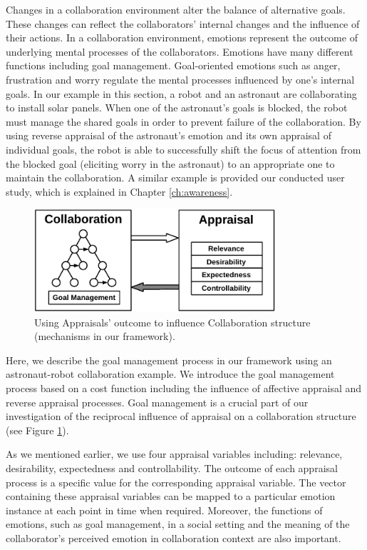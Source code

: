 \documentclass[12pt]{report}
\begin{document}
Changes in a collaboration environment alter the balance of alternative goals.
These changes can reflect the collaborators' internal changes and the influence
of their actions. In a collaboration environment, emotions represent the outcome
of underlying mental processes of the collaborators. Emotions have many
different functions \cite{scheutz:architectural-action-selection} including
goal management. Goal-oriented emotions such as anger, frustration and
worry regulate the mental processes influenced by one's internal goals. In our
example in this section, a robot and an astronaut are collaborating to install
solar panels. When one of the astronaut's goals is blocked, the robot must
manage the shared goals in order to prevent failure of the collaboration. By
using reverse appraisal \cite{gratch:reverse-appraisal} of the astronaut's
emotion and its own appraisal of individual goals, the robot is able to
successfully shift the focus of attention from the blocked goal (eliciting worry
in the astronaut) to an appropriate one to maintain the collaboration. A similar
example is provided our conducted user study, which is explained in Chapter
\ref{ch:awareness}.

\begin{figure}[t]
  \centering
  \includegraphics[width=0.8\textwidth]{figure/goal_management_croped.pdf}
  \caption{Using Appraisals' outcome to influence Collaboration structure
  (mechanisms in our framework).}
  \label{fig:appraisal-on-collaboration}
\end{figure}

Here, we describe the goal management process in our framework using an
astronaut-robot collaboration example. We introduce the goal management process
based on a cost function including the influence of affective appraisal and
reverse appraisal processes. Goal management is a crucial part of our
investigation of the reciprocal influence of appraisal on a collaboration
structure (see Figure \ref{fig:appraisal-on-collaboration}).

As we mentioned earlier, we use four appraisal variables including: relevance,
desirability, expectedness and controllability. The outcome of each appraisal
process is a specific value for the corresponding appraisal variable. The vector
containing these appraisal variables can be mapped to a particular emotion
instance at each point in time when required. Moreover, the functions of
emotions, such as goal management, in a social setting and the meaning of the
collaborator's perceived emotion in collaboration context are also important.
\end{document}
